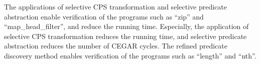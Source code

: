 
The applications of selective CPS transformation and selective predicate
abstraction enable verification of the programs such as ``zip'' and
``map\_head\_filter'', and reduce the running time.  Especially, the
application of selective CPS transformation reduces the running time,
and selective predicate abstraction reduces the number of CEGAR cycles.
The refined predicate discovery method enables verification of the
programs such as ``length'' and ``nth''.

